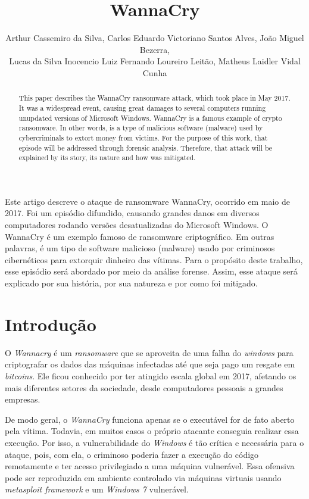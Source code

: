 \documentclass[12pt]{article}
\title{WannaCry}
\author{
Arthur Cassemiro da Silva\inst{1},
Carlos Eduardo Victoriano Santos Alves\inst{1},
João Miguel Bezerra\inst{1}, \\
Lucas da Silva Inocencio\inst{1}
Luiz Fernando Loureiro Leitão\inst{2},
Matheus Laidler Vidal Cunha\inst{2}
}
\begin{document}
 

\maketitle

\begin{abstract}
  This paper describes the WannaCry ransomware attack, which took place in May 2017. It was
  a widespread event, causing great damages to several computers running unupdated versions
  of Microsoft Windows. WannaCry is a famous example of crypto ransomware. In other words,
  is a type of malicious software (malware) used by cybercriminals to extort money from
  victims. For the purpose of this work, that episode will be addressed through forensic
  analysis. Therefore, that attack will be explained by its story, its nature and how was
  mitigated. 
\end{abstract}
     
\begin{resumo} 
  Este artigo descreve o ataque de ransomware WannaCry, ocorrido em maio de 2017. Foi um
  episódio difundido, causando grandes danos em diversos computadores rodando versões
  desatualizadas do Microsoft Windows. O WannaCry é um exemplo famoso de ransomware
  criptográfico. Em outras palavras, é um tipo de software malicioso (malware) usado por
  criminosos cibernéticos para extorquir dinheiro das vítimas. Para o propósito deste trabalho,
  esse episódio será abordado por meio da análise forense. Assim, esse ataque será explicado
  por sua história, por sua natureza e por como foi mitigado.
\end{resumo}

\section{Introdução}

O \textit{Wannacry} é um \textit{ransomware} que se aproveita de uma falha do \textit{windows} para criptografar os dados das máquinas infectadas até que seja pago um resgate em \textit{bitcoins}. Ele ficou conhecido por ter atingido escala global em 2017, afetando os mais diferentes setores da sociedade, desde computadores pessoais a grandes empresas.

De modo geral, o \textit{WannaCry} funciona apenas se o executável for de fato aberto pela vítima. Todavia, em muitos casos o próprio atacante conseguia realizar essa execução. Por isso, a vulnerabilidade do \textit{Windows} é tão crítica e necessária para o ataque, pois, com ela, o criminoso poderia fazer a execução do código remotamente e ter acesso privilegiado a uma máquina vulnerável. Essa ofensiva pode ser reproduzida em ambiente controlado via máquinas virtuais usando \textit{metasploit framework} e um \textit{Windows 7} vulnerável.
\end{document}
